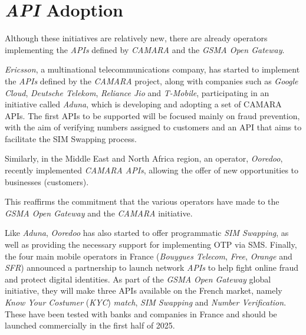 \section{\emph{API} Adoption} Although these initiatives are
relatively new, there are already operators implementing the
\emph{APIs} defined by \emph{CAMARA} and the \emph{GSMA Open
	Gateway}.

\emph{Ericsson}, a multinational telecommunications company, has
started to implement the \emph{APIs} defined by the \emph{CAMARA}\cite{alleven_2024} project, along with companies such as \emph{Google Cloud},
\emph{Deutsche Telekom}, \emph{Reliance Jio} and
\emph{T-Mobile}\cite{aduna},
participating in an initiative called \emph{Aduna}, which is
developing and adopting a set of CAMARA APIs. The first APIs to
be supported will be focused mainly on fraud prevention, with the
aim of verifying numbers assigned to customers and an API that
aims to facilitate the SIM Swapping
process\cite{jones_2025}.

Similarly, in the Middle East and North Africa region, an
operator, \emph{Ooredoo}, recently implemented \emph{CAMARA
	APIs}, allowing the offer of new opportunities to businesses
(customers)\cite{ooredoo}.

This reaffirms the commitment that the various operators have
made to the \emph{GSMA Open Gateway} and the \emph{CAMARA}
initiative.

Like \emph{Aduna}, \emph{Ooredoo} has also started to offer programmatic
\emph{SIM Swapping}, as well as providing the necessary support for
implementing OTP via SMS. Finally, the four main mobile operators in France
(\emph{Bouygues Telecom}, \emph{Free}, \emph{Orange} and \emph{SFR}) announced
a partnership to launch network \emph{APIs} to help fight online fraud and
protect digital identities. As part of the \emph{GSMA Open Gateway} global
initiative, they will make three APIs available on the French market, namely
\emph{Know Your Costumer} (\emph{KYC}) \emph{match}, \emph{SIM Swapping} and
\emph{Number Verification}. These have been tested with banks and companies in
France and should be launched commercially in the first half of
2025\cite{gsma}.
